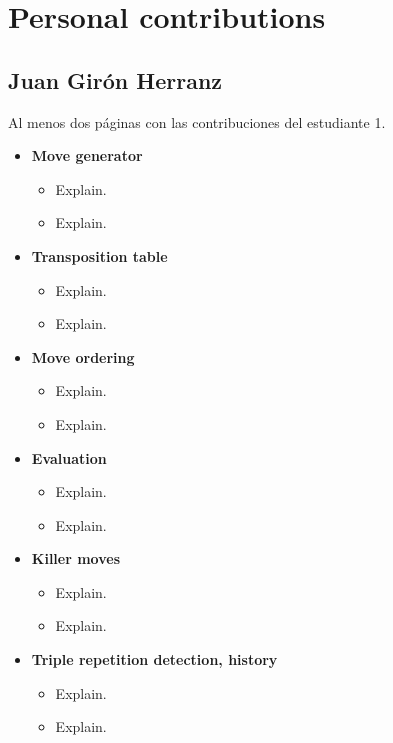 \chapter*{Personal contributions}
\label{cap:contribucionesPersonales}

\section*{Juan Girón Herranz}
Al menos dos páginas con las contribuciones del estudiante 1.

\begin{itemize}
    \item \textbf{Move generator}
    \begin{itemize}
        \item Explain.
        \item Explain.
    \end{itemize}
    
    \item \textbf{Transposition table}
    \begin{itemize}
        \item Explain.
        \item Explain.
    \end{itemize}
    
    \item \textbf{Move ordering}
    \begin{itemize}
        \item Explain.
        \item Explain.
    \end{itemize}
   
    \item \textbf{Evaluation}
    \begin{itemize}
        \item Explain.
        \item Explain.
    \end{itemize}

    \item \textbf{Killer moves}
    \begin{itemize}
        \item Explain.
        \item Explain.
    \end{itemize}

    \item \textbf{Triple repetition detection, history}
    \begin{itemize}
        \item Explain.
        \item Explain.
    \end{itemize}


\end{itemize}

